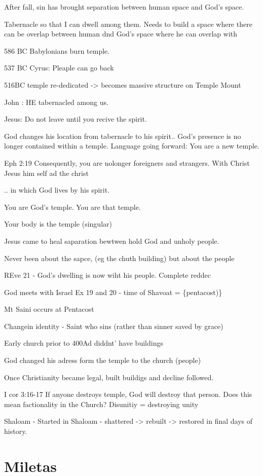 \documentclass[
]{book}
\begin{document}
After fall, sin has brought separation between human space and God's space.

Tabernacle so that I can dwell among them. Needs to build a space where there can be overlap between human dnd God's space where he can overlap with

586 BC Babylonians burn temple.

537 BC Cyrus: Pleaple can go back

516BC temple re-dedicated -\textgreater{} becomes massive structure on Temple Mount

John : HE tabernacled among us.

Jesus: Do not leave until you recive the spirit.

God changes his location from tabernacle to his spirit.. God's presence is no longer contained within a temple. Language going forward: You are a new temple.

Eph 2:19 Consequently, you are nolonger foreigners and strangers. With Christ Jesus him self ad the christ

.. in which God lives by his spirit.

You are God's temple. You are that temple.

Your body is the temple (singular)

Jesus came to heal saparation bewtwen hold God and unholy people.

Never been about the sapce, (eg the chuth building) but about the people

REve 21 - God's dwelling is now wiht his people. Complete reddec

God meets with Israel Ex 19 and 20 - time of Shavoat = \{pentacost)\}

Mt Saini occurs at Pentacost

Changein identity - Saint who sins (rather than sinner saved by grace)

Early church prior to 400Ad diddnt' have buildings

God changed his adress form the temple to the church (people)

Once Christianity became legal, built buildigs and decline followed.

I cor 3:16-17 If anyone destroys temple, God will destroy that person. Does this mean factionality in the Church? Disunitiy = destroying unity

Shaloam - Started in Shaloam - shattered -\textgreater{} rebuilt -\textgreater{} restored in final days of history.

\hypertarget{miletas}{%
\chapter{Miletas}\label{miletas}}
\end{document}
